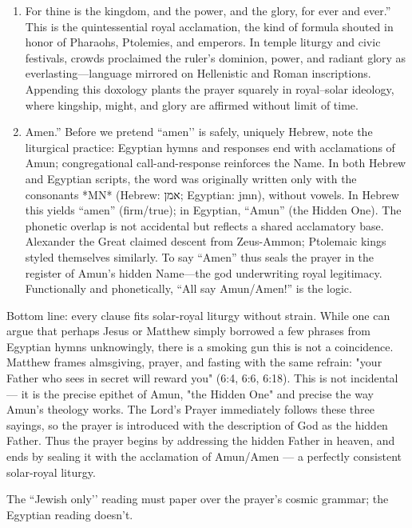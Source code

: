 \begin{enumerate}
    \item
    For thine is the kingdom, and the power, and the glory, for ever and ever.'' This is the quintessential royal acclamation, the kind of formula shouted in honor of Pharaohs, Ptolemies, and emperors. In temple liturgy and civic festivals, crowds proclaimed the ruler’s dominion, power, and radiant glory as everlasting—language mirrored on Hellenistic and Roman inscriptions. Appending this doxology plants the prayer squarely in royal–solar ideology, where kingship, might, and glory are affirmed without limit of time.
    \item
    Amen.'' Before we pretend ``amen’’ is safely, uniquely Hebrew, note the liturgical practice: Egyptian hymns and responses end with acclamations of Amun; congregational call-and-response reinforces the Name. In both Hebrew and Egyptian scripts, the word was originally written only with the consonants *MN* (Hebrew: אמן; Egyptian: jmn), without vowels. In Hebrew this yields “amen” (firm/true); in Egyptian, “Amun” (the Hidden One). The phonetic overlap is not accidental but reflects a shared acclamatory base. Alexander the Great claimed descent from Zeus-Ammon; Ptolemaic kings styled themselves similarly. To say “Amen” thus seals the prayer in the register of Amun’s hidden Name—the god underwriting royal legitimacy. Functionally and phonetically, “All say Amun/Amen!” is the logic.
\end{enumerate}

Bottom line: every clause fits solar-royal liturgy without strain.
While one can argue that perhaps Jesus or Matthew simply borrowed a few phrases from Egyptian hymns unknowingly, there is a smoking gun this is not a coincidence.
Matthew frames almsgiving, prayer, and fasting with the same refrain: "your Father who sees in secret will reward you" (6:4, 6:6, 6:18).
This is not incidental --- it is the precise epithet of Amun, "the Hidden One" and precise the way Amun's theology works.
The Lord's Prayer immediately follows these three sayings, so the prayer is introduced with the description of God as the hidden Father.
Thus the prayer begins by addressing the hidden Father in heaven, and ends by sealing it with the acclamation of Amun/Amen --- a perfectly consistent solar-royal liturgy.

The ``Jewish only’’ reading must paper over the prayer’s cosmic grammar; the Egyptian reading doesn’t.

